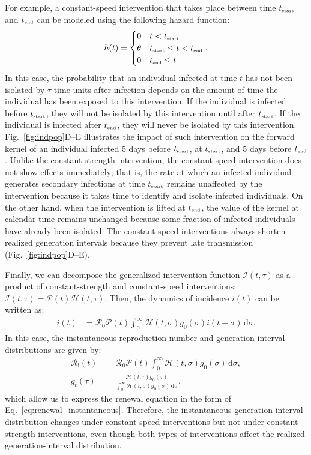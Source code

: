 \documentclass[12pt]{article}
\newcommand{\eref}[1]{Eq.~\ref{eq:#1}}
\newcommand{\fref}[1]{Fig.~\ref{fig:#1}}
\newcommand{\Rx}[1]{\ensuremath{{\mathcal R}_{#1}}\xspace}
\newcommand{\Ro}{\Rx{0}}
\newcommand{\Ri}{\Rx{\mathrm{i}}}
\newcommand{\RR}{\ensuremath{{\mathcal R}}\xspace}
\newcommand{\tsub}[2]{#1_{{\textrm{\tiny #2}}}}
\newcommand{\dd}[1]{\ensuremath{\, \mathrm{d}#1}}
\newcommand{\dsigma}{\dd{\sigma}}
\newcommand{\tstart}{\ensuremath{\tsub{t}{start}}\xspace}
\newcommand{\tend}{\ensuremath{\tsub{t}{end}}\xspace}
\newcommand{\PP}{\ensuremath{\mathcal P}}
\newcommand{\II}{\ensuremath{\mathcal I}}
\newcommand{\HH}{\ensuremath{\mathcal H}}
\begin{document}
For example, a constant-speed intervention that takes place between time \tstart and \tend can be modeled using the following hazard function:
\begin{equation}
h(t) = \begin{cases}
0 & t < \tstart\\
\theta & \tstart \leq t < \tend\\
0 & \tend \leq t
\end{cases}.
\end{equation}
In this case, the probability that an individual infected at time $t$ has not been isolated by $\tau$ time units after infection depends on the amount of time the individual has been exposed to this intervention.
If the individual is infected before $\tstart$, they will not be isolated by this intervention until after $\tstart$.
If the individual is infected after $\tend$, they will never be isolated by this intervention.
\fref{indpop}D--E illustrates the impact of such intervention on the forward kernel of an individual infected 5 days before $\tstart$, at $\tstart$, and 5 days before $\tend$.
Unlike the constant-strength intervention, the constant-speed intervention does not show effects immediately;
that is, the rate at which an infected individual generates secondary infections at time $\tstart$ remains unaffected by the intervention because it takes time to identify and isolate infected individuals.
On the other hand, when the intervention is lifted at $\tend$, the value of the kernel at calendar time remains unchanged because some fraction of infected individuals have already been isolated.
The constant-speed interventions always shorten realized generation intervals because they prevent late transmission (\fref{indpop}D--E).

Finally, we can decompose the generalized intervention function $\II(t, \tau)$ as a product of constant-strength and constant-speed interventions: $\II(t, \tau) = \PP(t) \HH(t, \tau)$. 
Then, the dynamics of incidence $i(t)$ can be written as:
\begin{align}
i(t) &= \Ro \PP(t) \int_0^\infty \HH(t, \sigma) g_0(\sigma) i(t-\sigma)\dsigma.
\end{align}
In this case, the instantaneous reproduction number and generation-interval distributions are given by:
\begin{align}
\Ri(t) &= \RR_0 \PP(t) \int_0^\infty \HH(t,\sigma) g_0(\sigma) \dsigma,\\
g_t(\tau) &= \frac{\HH(t,\tau) g_0(\tau)}{\int_0^\infty \HH(t,\sigma) g_0(\sigma) \dsigma},
\end{align}
which allow us to express the renewal equation in the form of \eref{renewal_instantaneous}.
Therefore, the instantaneous generation-interval distribution changes under constant-speed interventions but not under constant-strength interventions, even though both types of interventions affect the realized generation-interval distribution.
\end{document}
